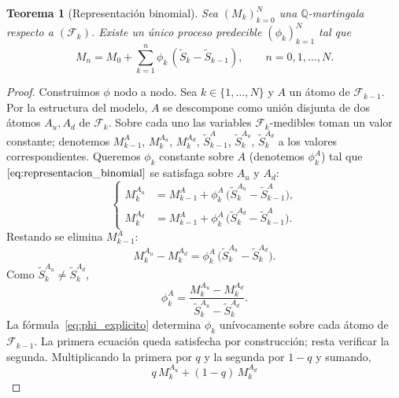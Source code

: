 \documentclass[11pt,a4paper,oneside]{report}
\theoremstyle{plain}
\newtheorem{teorema}{Teorema}[chapter]
\theoremstyle{definition}
\theoremstyle{remark}
\newcommand{\Q}{\mathbb{Q}}
\newcommand{\F}{\mathcal{F}}
\newcommand{\1}{\mathbf{1}}
\begin{document}
\begin{teorema}[Representación binomial]
\label{teo:representacion_binomial}
Sea $(M_k)_{k=0}^{N}$ una $\Q$-martingala respecto a $(\F_k)$. Existe
un único proceso predecible $(\phi_k)_{k=1}^N$ tal que
\begin{equation}\label{eq:representacion_binomial}
  M_n = M_0 + \sum_{k=1}^{n} \phi_k\, (\widetilde S_k - \widetilde S_{k-1}),
  \qquad n = 0, 1, \ldots, N.
\end{equation}
\end{teorema}

\begin{proof}
Construimos $\phi$ nodo a nodo. Sea $k \in \{1, \ldots, N\}$ y $A$ un
átomo de $\F_{k-1}$. Por la estructura del modelo, $A$ se descompone
como unión disjunta de dos átomos $A_u, A_d$ de $\F_k$. Sobre cada uno
las variables $\F_k$-medibles toman un valor constante; denotemos
$M_{k-1}^A$, $M_k^{A_u}$, $M_k^{A_d}$, $\widetilde S_{k-1}^A$,
$\widetilde S_k^{A_u}$, $\widetilde S_k^{A_d}$ a los valores
correspondientes. Queremos $\phi_k$ constante sobre $A$ (denotemos
$\phi_k^A$) tal que $\eqref{eq:representacion_binomial}$ se satisfaga
sobre $A_u$ y $A_d$:
\begin{equation*}
\left\{
\begin{aligned}
  M_k^{A_u} &= M_{k-1}^A + \phi_k^A\,
              \bigl(\widetilde S_k^{A_u} - \widetilde S_{k-1}^A\bigr), \\
  M_k^{A_d} &= M_{k-1}^A + \phi_k^A\,
              \bigl(\widetilde S_k^{A_d} - \widetilde S_{k-1}^A\bigr).
\end{aligned}
\right.
\end{equation*}
Restando se elimina $M_{k-1}^A$:
\begin{equation*}
  M_k^{A_u} - M_k^{A_d}
  = \phi_k^A\, \bigl(\widetilde S_k^{A_u} - \widetilde S_k^{A_d}\bigr).
\end{equation*}
Como $\widetilde S_k^{A_u} \neq \widetilde S_k^{A_d}$,
\begin{equation}\label{eq:phi_explicito}
  \phi_k^A = \frac{M_k^{A_u} - M_k^{A_d}}{\widetilde S_k^{A_u}
                                          - \widetilde S_k^{A_d}}.
\end{equation}
La fórmula~\eqref{eq:phi_explicito} determina $\phi_k$ unívocamente
sobre cada átomo de $\F_{k-1}$. La primera ecuación queda satisfecha
por construcción; resta verificar la segunda. Multiplicando la primera
por $q$ y la segunda por $1 - q$ y sumando,
\begin{equation*}
  q\, M_k^{A_u} + (1-q)\, M_k^{A_d}

\end{equation*}
\end{proof}
\end{document}
